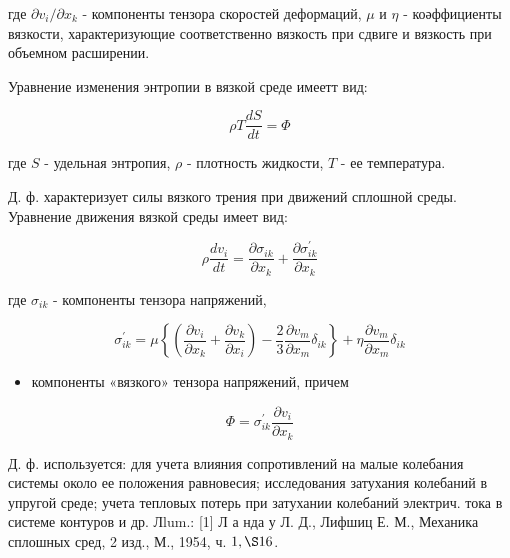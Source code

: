 \documentclass[10pt]{article}
\begin{document}
где $\partial v_{i} / \partial x_{k}$ - компоненты тензора скоростей деформаций, $\mu$ и $\eta$ - коәффициенты вязкости, характеризующие соответственно вязкость при сдвиге и вязкость при объемном расширении.



Уравнение изменения энтропии в вязкой среде имеетт вид:



\[

\rho T \frac{d S}{d t}=\Phi

\]



где $S$ - удельная энтропия, $\rho$ - плотность жидкости, $T$ - ее температура.



Д. ф. характеризует силы вязкого трения при движений сплошной среды. Уравнение движения вязкой среды имеет вид:



\[

\rho \frac{d v_{i}}{d t}=\frac{\partial \sigma_{i k}}{\partial x_{k}}+\frac{\partial \sigma_{i k}^{\prime}}{\partial x_{k}}

\]



где $\sigma_{i k}$ - компоненты тензора напряжений,



\[

\sigma_{i k}^{\prime}=\mu\left\{\left(\frac{\partial v_{i}}{\partial x_{k}}+\frac{\partial v_{k}}{\partial x_{i}}\right)-\frac{2}{3} \frac{\partial v_{m}}{\partial x_{m}} \delta_{i k}\right\}+\eta \frac{\partial v_{m}}{\partial x_{m}} \delta_{i k}

\]



\begin{itemize}

  \item компоненты «вязкого» тензора напряжений, причем

\end{itemize}



\[

\Phi=\sigma_{i k}^{\prime} \frac{\partial v_{i}}{\partial x_{k}}

\]



Д. ф. используется: для учета влияния сопротивлений на малые колебания системы около ее положения равновесия; исследования затухания колебаний в упругой среде; учета тепловых потерь при затухании колебаний электрич. тока в системе контуров и др. Лlum.: [1] Л а нда у Л. Д., Лифшиц Е. М., Механика сплошных сред, 2 изд., М., 1954, ч. $1, \S 16$.
\end{document}

